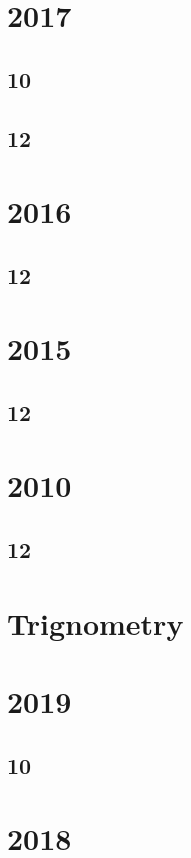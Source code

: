 \section{2017}
\subsection{10}

\subsection{12}



\section{2016}
\subsection{12}



\section{2015}
\subsection{12}


\section{2010}
\subsection{12}




\section{Trignometry}
\section{2019}
\subsection{10}

\section{2018}
